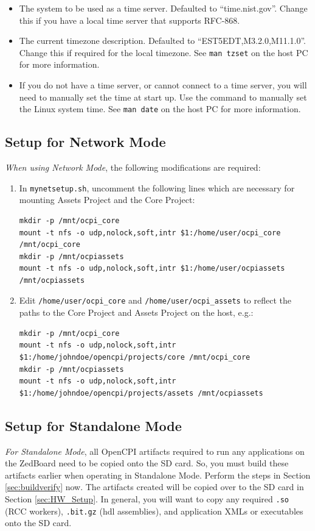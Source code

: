 \begin{itemize}
 \item The system to be used as a time server. Defaulted to ``time.nist.gov''. Change this if you have a local time server that supports RFC-868.
 \item The current timezone description. Defaulted to ``EST5EDT,M3.2.0,M11.1.0''.  Change this if required for the local timezone. See \texttt{man tzset} on the host PC for more information.
 \item If you do not have a time server, or cannot connect to a time server, you will need to manually set the time at start up.  Use the  command to manually set the Linux system time. See \texttt{man date} on the host PC for more information.
 \end{itemize}

\subsection{Setup for Network Mode}
\begin{flushleft}
\textit{When using Network Mode}, the following modifications are required:
\end{flushleft}

\begin{enumerate}
\item In \texttt{mynetsetup.sh}, uncomment the following lines which are necessary for mounting Assets Project and the Core Project:
\begin{verbatim}
mkdir -p /mnt/ocpi_core
mount -t nfs -o udp,nolock,soft,intr $1:/home/user/ocpi_core /mnt/ocpi_core
mkdir -p /mnt/ocpiassets
mount -t nfs -o udp,nolock,soft,intr $1:/home/user/ocpiassets /mnt/ocpiassets
\end{verbatim}
 \item Edit \texttt{/home/user/ocpi\_core} and \texttt{/home/user/ocpi\_assets} to reflect the paths to the Core Project and Assets Project on the host, e.g.: \\
\begin{verbatim}
mkdir -p /mnt/ocpi_core
mount -t nfs -o udp,nolock,soft,intr $1:/home/johndoe/opencpi/projects/core /mnt/ocpi_core
mkdir -p /mnt/ocpiassets
mount -t nfs -o udp,nolock,soft,intr $1:/home/johndoe/opencpi/projects/assets /mnt/ocpiassets
\end{verbatim}
\end{enumerate}

\label{sec:buildNow}
\subsection{Setup for Standalone Mode}
\textit{For Standalone Mode}, all OpenCPI artifacts required to run any applications on the ZedBoard need to be copied onto the SD card.  So, you must build these artifacts earlier when operating in Standalone Mode. Perform the steps in Section \ref{sec:buildverify}  now. The artifacts created will be copied over to the SD card in Section \ref{sec:HW_Setup}. In general, you will want to copy any required \texttt{.so} (RCC workers), \texttt{.bit.gz} (hdl assemblies), and application XMLs or executables onto the SD card.

